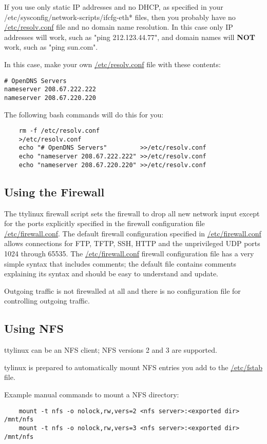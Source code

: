\documentclass[10pt]{article}
\begin{document}
If you use only static IP addresses and no DHCP, as specified in your 
/etc/sysconfig/network-scripts/ifcfg-eth* files, then you probably have no
\url{/etc/resolv.conf} file and no domain name resolution. In this case only
IP addresses will work, such as "ping 212.123.44.77", and domain names will
{\bf NOT} work, such as "ping sun.com".

In this case, make your own \url{/etc/resolv.conf} file with these contents:
\begin{lstlisting}
# OpenDNS Servers
nameserver 208.67.222.222
nameserver 208.67.220.220
\end{lstlisting}

The following bash commands will do this for you:
\begin{lstlisting}
	rm -f /etc/resolv.conf
	>/etc/resolv.conf
	echo "# OpenDNS Servers"         >>/etc/resolv.conf
	echo "nameserver 208.67.222.222" >>/etc/resolv.conf
	echo "nameserver 208.67.220.220" >>/etc/resolv.conf
\end{lstlisting}

\subsection{Using the Firewall}
\label{firewaller}

The ttylinux firewall script sets the firewall to drop all new network input
except for the ports explicitly specified in the firewall configuration file
\url{/etc/firewall.conf}. The default firewall configuration specified in
\url{/etc/firewall.conf} allows connections for FTP, TFTP, SSH, HTTP and the
unprivileged UDP ports 1024 through 65535. The \url{/etc/firewall.conf}
firewall configuration file has a very simple syntax that includes comments;
the default file contains comments explaining its syntax and should be easy to
understand and update.

Outgoing traffic is not firewalled at all and there is no configuration file
for controlling outgoing traffic.

\subsection{Using NFS}

ttylinux can be an NFS client; NFS versions 2 and 3 are supported.

tylinux is prepared to automatically mount NFS entries you add to the
\url{/etc/fstab} file.

Example manual commands to mount a NFS directory:
\begin{lstlisting}
	mount -t nfs -o nolock,rw,vers=2 <nfs server>:<exported dir> /mnt/nfs
	mount -t nfs -o nolock,rw,vers=3 <nfs server>:<exported dir> /mnt/nfs
\end{lstlisting}
\end{document}
